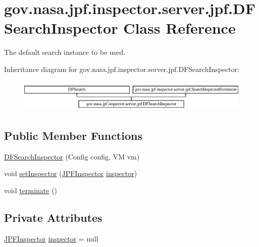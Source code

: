 \hypertarget{classgov_1_1nasa_1_1jpf_1_1inspector_1_1server_1_1jpf_1_1_d_f_search_inspector}{}\section{gov.\+nasa.\+jpf.\+inspector.\+server.\+jpf.\+D\+F\+Search\+Inspector Class Reference}
\label{classgov_1_1nasa_1_1jpf_1_1inspector_1_1server_1_1jpf_1_1_d_f_search_inspector}


The default search instance to be used.  


Inheritance diagram for gov.\+nasa.\+jpf.\+inspector.\+server.\+jpf.\+D\+F\+Search\+Inspector\+:\begin{figure}[H]
\begin{center}
\leavevmode
\includegraphics[height=1.573034cm]{classgov_1_1nasa_1_1jpf_1_1inspector_1_1server_1_1jpf_1_1_d_f_search_inspector}
\end{center}
\end{figure}
\subsection*{Public Member Functions}
\begin{DoxyCompactItemize}
\item 
\hyperlink{classgov_1_1nasa_1_1jpf_1_1inspector_1_1server_1_1jpf_1_1_d_f_search_inspector_ae6284f8ae3e033ab7582010664743897}{D\+F\+Search\+Inspector} (Config config, VM vm)
\item 
void \hyperlink{classgov_1_1nasa_1_1jpf_1_1inspector_1_1server_1_1jpf_1_1_d_f_search_inspector_adc5b589303dc4727f535e01562c6e041}{set\+Inspector} (\hyperlink{classgov_1_1nasa_1_1jpf_1_1inspector_1_1server_1_1jpf_1_1_j_p_f_inspector}{J\+P\+F\+Inspector} \hyperlink{classgov_1_1nasa_1_1jpf_1_1inspector_1_1server_1_1jpf_1_1_d_f_search_inspector_ad69f2b0807d745d900c8e341351d8469}{inspector})
\item 
void \hyperlink{classgov_1_1nasa_1_1jpf_1_1inspector_1_1server_1_1jpf_1_1_d_f_search_inspector_a38333f3c6158ad2b2b6dbc8688b2d6bb}{terminate} ()
\end{DoxyCompactItemize}
\subsection*{Private Attributes}
\begin{DoxyCompactItemize}
\item 
\hyperlink{classgov_1_1nasa_1_1jpf_1_1inspector_1_1server_1_1jpf_1_1_j_p_f_inspector}{J\+P\+F\+Inspector} \hyperlink{classgov_1_1nasa_1_1jpf_1_1inspector_1_1server_1_1jpf_1_1_d_f_search_inspector_ad69f2b0807d745d900c8e341351d8469}{inspector} = null
\end{DoxyCompactItemize}


